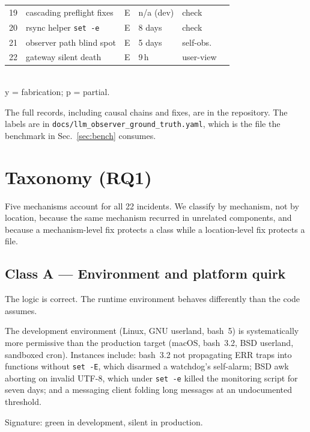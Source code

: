 \documentclass[conference]{IEEEtran}
\begin{document}
\begin{table}[t]
\begin{tabular}{@{}r l c l l c@{}}
19 & cascading preflight fixes      & E & n/a (dev)   & check & \\
20 & rsync helper \texttt{set -e}   & E & 8 days      & check & \\
21 & observer path blind spot       & E & 5 days      & self-obs. & \\
22 & gateway silent death           & E & 9\,h        & user-view & \\
\bottomrule
\end{tabular}
\vspace{0.3em}
\\{\footnotesize y = fabrication; p = partial.}
\end{table}

The full records, including causal chains and fixes, are in the repository.
The labels are in \texttt{docs/llm\_observer\_ground\_truth.yaml}, which is
the file the benchmark in Sec.~\ref{sec:bench} consumes.

\section{Taxonomy (RQ1)}
\label{sec:taxonomy}

Five mechanisms account for all 22 incidents. We classify by mechanism, not
by location, because the same mechanism recurred in unrelated components,
and because a mechanism-level fix protects a class while a location-level
fix protects a file.

\subsection{Class A --- Environment and platform quirk}

The logic is correct. The runtime environment behaves differently than the
code assumes.

The development environment (Linux, GNU userland, bash~5) is systematically
more permissive than the production target (macOS, bash~3.2, BSD userland,
sandboxed cron). Instances include: bash~3.2 not propagating ERR traps into
functions without \texttt{set -E}, which disarmed a watchdog's self-alarm;
BSD awk aborting on invalid UTF-8, which under \texttt{set -e} killed the
monitoring script for seven days; and a messaging client folding long
messages at an undocumented threshold.

Signature: green in development, silent in production.
\end{document}
